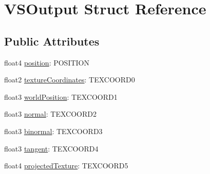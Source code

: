 \hypertarget{struct_v_s_output}{
\section{VSOutput Struct Reference}
\label{struct_v_s_output}
}
\subsection*{Public Attributes}
\begin{DoxyCompactItemize}
\item 
float4 \hyperlink{struct_v_s_output_a045a78f2b66109778b98e52a787d2797}{position}: POSITION
\item 
float2 \hyperlink{struct_v_s_output_a7fcd6443a5043bbfd98d1ff3b415b84b}{textureCoordinates}: TEXCOORD0
\item 
float3 \hyperlink{struct_v_s_output_a8151fbd902476f1b8fd2034c78f31ec5}{worldPosition}: TEXCOORD1
\item 
float3 \hyperlink{struct_v_s_output_a67a1540c109a358cb23fe13df347873f}{normal}: TEXCOORD2
\item 
float3 \hyperlink{struct_v_s_output_a5a39c9271837b0fe535541897d619fde}{binormal}: TEXCOORD3
\item 
float3 \hyperlink{struct_v_s_output_a645d68bb4487061a976c9de66d1350bb}{tangent}: TEXCOORD4
\item 
float4 \hyperlink{struct_v_s_output_a1f9794d3a0b3d5bf729a8cee2b710684}{projectedTexture}: TEXCOORD5
\end{DoxyCompactItemize}


